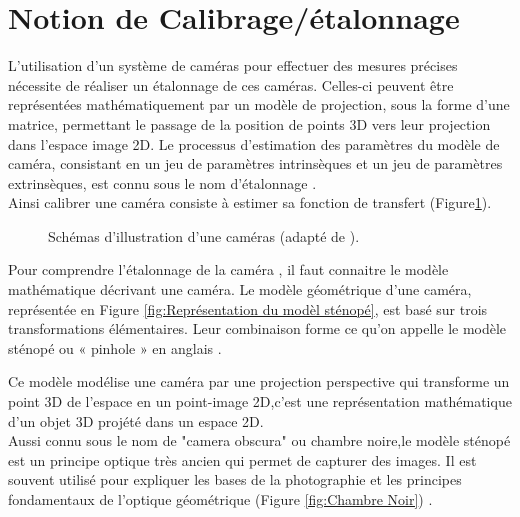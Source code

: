  
 \newpage
 
 
 \section{Notion de  Calibrage/étalonnage}\label{sec:Notion de  Calibrage/étalonnage}
 
 L’utilisation d’un système de caméras pour effectuer des mesures précises nécessite de réaliser un étalonnage de ces caméras. Celles-ci peuvent être représentées mathématiquement par un modèle de projection, sous la forme d’une matrice, permettant le passage de la position de points 3D vers leur projection dans l’espace image 2D. Le processus d’estimation des paramètres du modèle de caméra, consistant en un jeu de paramètres intrinsèques et un jeu de paramètres extrinsèques, est connu sous le nom d’étalonnage \cite{eikosim_etalonnage_2021}.\\
 Ainsi calibrer une caméra consiste à estimer sa fonction de transfert \cite{orteu_calibrage_nodate} (Figure\ref{fig:Illustration caméras}).
 
 \begin{figure}[H]%
 	\center%
 	\setlength{\fboxsep}{5pt}%
 	\setlength{\fboxrule}{0.5pt}%
   \caption[Illustration d'une caméras]{Schémas d'illustration d'une caméras (adapté de \cite{orteu_calibrage_nodate}).}
   \label{fig:Illustration caméras}
 \end{figure}
 
 Pour comprendre l'étalonnage de la caméra , il faut connaitre le modèle mathématique décrivant une caméra.
 Le modèle géométrique d’une caméra, représentée en Figure \ref{fig:Représentation du modèl sténopé}, est basé sur trois transformations élémentaires. Leur combinaison forme ce qu’on appelle le modèle sténopé ou « pinhole » en anglais \cite{eikosim_etalonnage_2021}.
 
  Ce modèle modélise une caméra par une projection perspective qui transforme un point 3D de l'espace en un point-image 2D,c'est une représentation mathématique d'un objet 3D projété dans un espace 2D\cite{orteu_calibrage_nodate}.\\
  Aussi connu sous le nom de "camera obscura" ou chambre noire,le modèle sténopé est un principe optique très ancien qui permet de capturer des images. Il est souvent utilisé pour expliquer les bases de la photographie et les principes fondamentaux de l'optique géométrique (Figure \ref{fig:Chambre Noir}) . 
 
